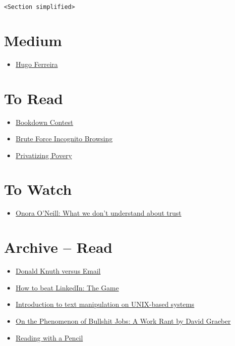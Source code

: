 \documentclass[]{book}
\providecommand{\tightlist}{%
  \setlength{\itemsep}{0pt}\setlength{\parskip}{0pt}}
\theoremstyle{definition}
\theoremstyle{definition}
\theoremstyle{definition}
\theoremstyle{remark}
\begin{document}
\texttt{\textless{}Section\ simplified\textgreater{}}

\section{Medium}\label{medium}

\begin{itemize}
\tightlist
\item
  \href{https://medium.com/@hugorcf}{Hugo Ferreira}
\end{itemize}

\section{To Read}\label{to-read}

\begin{itemize}
\tightlist
\item
  \href{https://community.rstudio.com/tags/bookdown-contest}{Bookdown
  Contest}
\item
  \href{https://nullprogram.com/blog/2018/09/06/}{Brute Force Incognito
  Browsing}
\item
  \href{https://thebaffler.com/salvos/privatizing-poverty-phillips-fein}{Privatizing
  Povery}
\end{itemize}

\section{To Watch}\label{to-watch}

\begin{itemize}
\tightlist
\item
  \href{https://www.ted.com/talks/onora_o_neill_what_we_don_t_understand_about_trust}{Onora
  O'Neill: What we don't understand about trust}
\end{itemize}

\section{Archive -- Read}\label{archive-read}

\begin{itemize}
\tightlist
\item
  \href{https://www-cs-faculty.stanford.edu/~knuth/email.html}{Donald
  Knuth versus Email}
\item
  \href{https://theoutline.com/post/5495/how-to-beat-linked-in-the-game}{How
  to beat LinkedIn: The Game}
\item
  \href{https://www.ibm.com/developerworks/aix/library/au-unixtext/index.html}{Introduction
  to text manipulation on UNIX-based systems}
\item
  \href{http://www.strikemag.org/bullshit-jobs/}{On the Phenomenon of
  Bullshit Jobs: A Work Rant by David Graeber}
\item
  \href{https://austinkleon.com/2018/08/30/reading-with-a-pencil/}{Reading
  with a Pencil}
\end{itemize}
\end{document}

